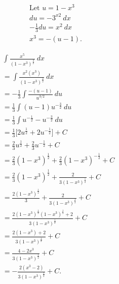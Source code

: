 \documentclass{report}
\begin{document}
    \bigbreak \noindent 
    \begin{minipage}[t]{0.47\textwidth}
    \begin{align*}
        \text{Let $u=1-x^{3}$} \\
        du = -3^{x2}\ dx\\
        -\frac{1}{3}du = x^{2}\ dx \\
        x^{3} = -(u-1)
    .\end{align*}
    \end{minipage}
    \begin{minipage}[t]{0.45\textwidth}
        \begin{align*}
           &\int \frac{x^{5}}{(1-x^{3})^{\frac{3}{2}}}\ dx \\
           &=\int \frac{x^{2}(x^{3})}{(1-x^{3})^{\frac{3}{2}}}\ dx  \\
           &=-\frac{1}{3}\int \frac{-(u-1)}{u^{3/2}}\ du \\
           &=\frac{1}{3}\int (u-1)u^{-\frac{3}{2}}\ du \\
           &=\frac{1}{3}\int u^{-\frac{1}{2}}-u^{-\frac{3}{2}}\ du \\
           &=\frac{1}{3}\bigg[2u^{\frac{1}{2}}+2u^{-\frac{1}{2}}\bigg] + C\\
           &=\frac{2}{3}u^{\frac{1}{2}}+\frac{2}{3}u^{-\frac{1}{2}} + C \\
           &= \frac{2}{3}(1-x^{3})^{\frac{1}{2}}+\frac{2}{3}(1-x^{3})^{-\frac{1}{2}} + C\\
           &=\frac{2}{3}(1-x^{3})^{\frac{1}{2}} + \frac{2}{3(1-x^{3})^{\frac{1}{2}}} + C \\
           &=\frac{2(1-x^{3})^{\frac{1}{2}}}{3} + \frac{2}{3(1-x^{3})^{\frac{1}{2}}} + C \\
           &=\frac{2(1-x^{3})^{\frac{1}{2}}(1-x^{3})^{\frac{1}{2}}+2}{3(1-x^{3})^{\frac{1}{2}}} + C  \\
           &=\frac{2(1-x^{3})+2}{3(1-x^{3})^{\frac{1}{2}}} + C \\
           &=\frac{4-2x^{3}}{3(1-x^{3})^{\frac{1}{2}}} +C\\
           &= -\frac{2(x^{3}-2)}{3(1-x^{3})^{\frac{1}{2}}} + C
        .\end{align*}
    \end{minipage}

    \pagebreak \bigbreak \noindent 
\end{document}
